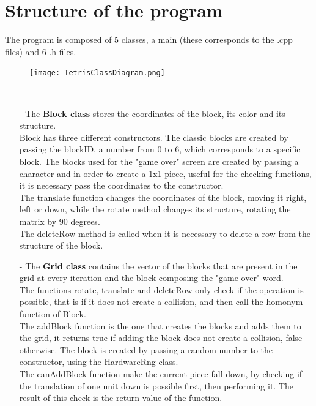 \documentclass[18pt,oneside,a4paper, titlepage]{article}
\begin{document}
\section{Structure of the program}
	The program is composed of 5 classes, a main (these corresponds to the .cpp files) and 6 .h files.\\
	\vspace{0.5cm}
	\begin{figure}[h]
		\centering
		\texttt{[image: TetrisClassDiagram.png]}
	\end{figure}
	\vspace{0.5cm}
	\\
	\begin{itemize}
		\item[-] The \textbf{Block class} stores the coordinates of the block, its color and its structure.\\
		Block has three different constructors. The classic blocks are created by passing the blockID, a number from 0 to 6, which corresponds to a specific block.
		The blocks used for the "game over" screen are created by passing a character and in order to create a 1x1 piece, useful for the checking functions, it is necessary pass the coordinates to the constructor.\\
		The translate function changes the coordinates of the block, moving it right, left or down, while the rotate method changes its structure, rotating the matrix by 90 degrees.\\
		The deleteRow method is called when it is necessary to delete a row from the structure of the block.\\
		\item[-] The \textbf{Grid class} contains the vector of the blocks that are present in the grid at every iteration and the block composing the "game over" word.\\
		The functions rotate, translate and deleteRow only check if the operation is possible, that is if it does not create a collision, and then call the homonym function of Block.\\
		The addBlock function is the one that creates the blocks and adds them to the grid, it returns true if adding the block does not create a collision, false otherwise. The block is created by passing a random number to the constructor, using the HardwareRng class.\\
		The canAddBlock function make the current piece fall down, by checking if the translation of one unit down is possible first, then performing it. The result of this check is the return value of the function.\\

\end{itemize}
\end{document}
